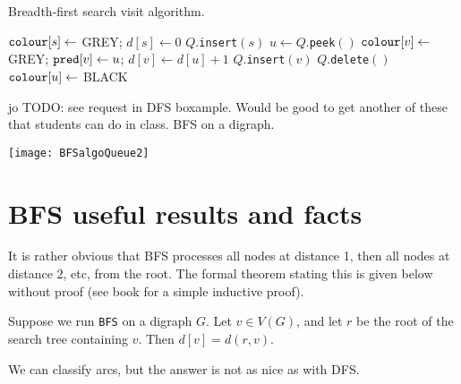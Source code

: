 \begin{algorithm}[H]
  \caption{Breadth-first search visit algorithm.}
     \label{alg:BFSvisitcode}
  \begin{algorithmic}[1]
	\State $\operatorname{\text{\texttt{colour}}}[s] \gets $ GREY; $d[s] \gets 0$ 
	\State $Q$.\texttt{insert}$(s)$
		\State $u \gets Q$.\texttt{peek}$()$
				\State $\operatorname{\text{\texttt{colour}}}[v] \gets $ GREY; $\operatorname{\text{\texttt{pred}}}[v] \gets u$; $d[v] \gets d[u]+1$
				\State $Q$.\texttt{insert}$(v)$
			\EndIf
		\EndFor
		\State $Q$.\texttt{delete}$()$
		\State $\operatorname{\text{\texttt{colour}}}[u] \gets $ BLACK
	\EndWhile
\EndFunction
\end{algorithmic}
\end{algorithm}

\begin{Boxample}
jo TODO: see request in DFS boxample. Would be good to get another of these that students can do in class.
BFS on a digraph.
\begin{center}
  \texttt{[image: BFSalgoQueue2]}
\end{center}
\end{Boxample}

\section{BFS useful results and facts} 
It is rather obvious that BFS processes all nodes at distance 1, then
all nodes at distance 2, etc, from the root. 
The formal theorem stating this is given below without proof (see book for a simple inductive proof).

\begin{Theorem} \label{thm:BFSdist}
Suppose we run \texttt{BFS} on a digraph $G$.
Let $v \in V(G)$, and let $r$ be the root of the search tree containing $v$. 
Then $d[v] = d(r, v)$.
\end{Theorem}

We can classify arcs, but the answer is not as nice as with DFS.

